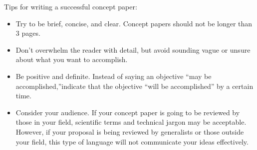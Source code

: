\documentclass[11pt]{article}
\begin{document}
	
    	
    	
    	
    	\newpage
      \LARGE {Tips for writing a successful concept paper:}
       \begin{itemize}
       	\item Try to be brief, concise, and clear. Concept papers should not be longer than 3 pages. 
       	\item Don’t overwhelm the reader with detail, but avoid sounding vague or unsure about what you want to accomplish. 
       	\item Be positive and definite. Instead of saying an objective “may be accomplished,”indicate that the objective “will be accomplished” by a certain time. 
       	\item Consider your audience. If your concept paper is going to be reviewed by those in your field, scientific terms and technical jargon may be acceptable. However, if your proposal is being reviewed by generalists or those outside your field, this type of language will not communicate your ideas effectively.
       \end{itemize}
       	
       
       
\end{document}

